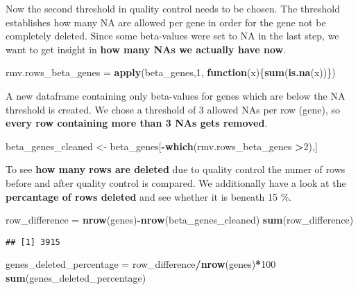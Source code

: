 \documentclass[]{article}
\newenvironment{Shaded}{\begin{snugshade}}{\end{snugshade}}
\newcommand{\KeywordTok}[1]{\textcolor[rgb]{0.13,0.29,0.53}{\textbf{#1}}}
\newcommand{\DecValTok}[1]{\textcolor[rgb]{0.00,0.00,0.81}{#1}}
\newcommand{\StringTok}[1]{\textcolor[rgb]{0.31,0.60,0.02}{#1}}
\newcommand{\ControlFlowTok}[1]{\textcolor[rgb]{0.13,0.29,0.53}{\textbf{#1}}}
\newcommand{\OperatorTok}[1]{\textcolor[rgb]{0.81,0.36,0.00}{\textbf{#1}}}
\newcommand{\NormalTok}[1]{#1}
\begin{document}
Now the second threshold in quality control needs to be chosen. The
threshold establishes how many NA are allowed per gene in order for the
gene not be completely deleted. Since some beta-values were set to NA in
the last step, we want to get insight in \textbf{how many NAs we
actually have now}.

\begin{Shaded}
\begin{Highlighting}[]
\NormalTok{rmv.rows_beta_genes =}\StringTok{ }\KeywordTok{apply}\NormalTok{(beta_genes,}\DecValTok{1}\NormalTok{, }\ControlFlowTok{function}\NormalTok{(x)\{}\KeywordTok{sum}\NormalTok{(}\KeywordTok{is.na}\NormalTok{(x))\})}
\end{Highlighting}
\end{Shaded}

A new dataframe containing only beta-values for genes which are below
the NA threshold is created. We chose a threshold of 3 allowed NAs per
row (gene), so \textbf{every row containing more than 3 NAs gets
removed}.

\begin{Shaded}
\begin{Highlighting}[]
\NormalTok{beta_genes_cleaned <-}\StringTok{ }\NormalTok{beta_genes[}\OperatorTok{-}\KeywordTok{which}\NormalTok{(rmv.rows_beta_genes }\OperatorTok{>}\DecValTok{2}\NormalTok{),]}
\end{Highlighting}
\end{Shaded}

To see \textbf{how many rows are deleted} due to quality control the
numer of rows before and after quality control is compared. We
additionally have a look at the \textbf{percantage of rows deleted} and
see whether it is beneath 15 \%.

\begin{Shaded}
\begin{Highlighting}[]
\NormalTok{row_difference =}\StringTok{ }\KeywordTok{nrow}\NormalTok{(genes)}\OperatorTok{-}\KeywordTok{nrow}\NormalTok{(beta_genes_cleaned)}
\KeywordTok{sum}\NormalTok{(row_difference)}
\end{Highlighting}
\end{Shaded}

\begin{verbatim}
## [1] 3915
\end{verbatim}

\begin{Shaded}
\begin{Highlighting}[]
\NormalTok{genes_deleted_percentage =}\StringTok{ }\NormalTok{row_difference}\OperatorTok{/}\KeywordTok{nrow}\NormalTok{(genes)}\OperatorTok{*}\DecValTok{100}
\KeywordTok{sum}\NormalTok{(genes_deleted_percentage)}
\end{Highlighting}
\end{Shaded}
\end{document}
